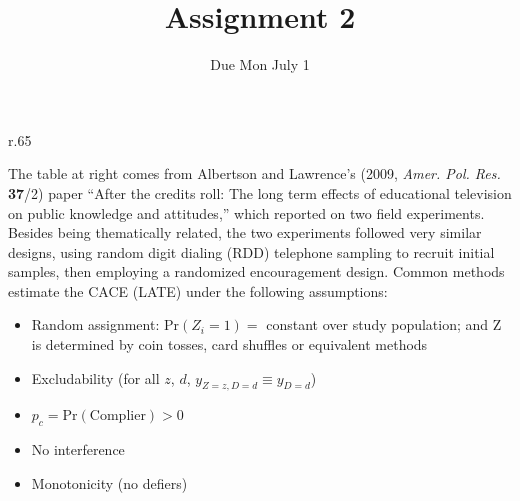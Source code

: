 \documentclass{article}
\title{Assignment 2}
\author{Due Mon July 1}
\begin{document}
\maketitle

\begin{minipage}{1.0\linewidth}

\begin{wrapfigure}{r}{.65\linewidth}
\end{wrapfigure}

The table at right comes from Albertson and Lawrence's (2009, \textit{Amer. Pol. Res.} \textbf{37}/2) paper ``After the credits roll: The long term effects of educational television on public knowledge and attitudes,'' which reported on two field experiments. Besides being thematically related, the two experiments followed very similar designs, using random digit dialing (RDD) telephone sampling to recruit initial samples, then employing a randomized encouragement design.  Common methods estimate the CACE (LATE) under the following assumptions:

\begin{itemize}
\item Random assignment: $\mathrm{Pr}(Z_{i}=1) = $ constant over study population;  and $\mathrm{Z} $ is determined by coin tosses, card shuffles or equivalent methods
\item Excludability (for all $z$, $d$, $y_{Z=z, D=d} \equiv y_{D=d}$)
\item $p_{c} = \mathrm{Pr}(\mathrm{Complier}) > 0$
\item No interference
\item Monotonicity (no defiers)
\end{itemize}

\end{minipage}
\vspace{4ex}
\end{document}

